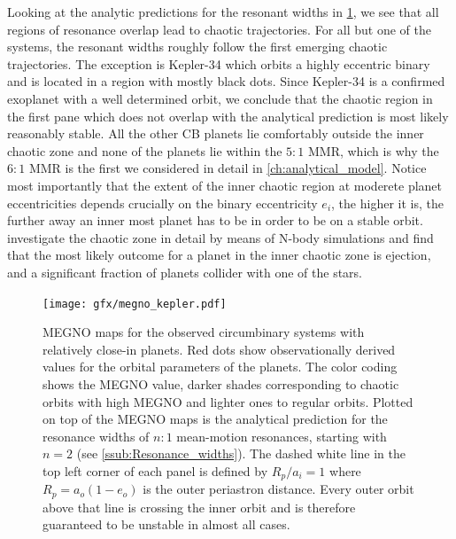\documentclass[ twoside,openright,titlepage,numbers=noenddot,headinclude,%
                footinclude=true,cleardoublepage=empty,abstractoff, %
                BCOR=5mm,paper=a4,fontsize=11pt,%
                american,%
                ]{scrreprt}
\begin{document}
Looking at the analytic predictions for the resonant widths in 
\cref{fig:megno_kepler}, we see that all regions of resonance overlap
lead to chaotic trajectories. For all but one of the systems, the 
resonant widths roughly follow the first emerging chaotic trajectories.
The exception is Kepler-34 which orbits a highly eccentric binary
and is located in a region with mostly black dots. Since Kepler-34 
is a confirmed exoplanet with a well determined orbit, we conclude 
that the chaotic region in the first pane which does not overlap with 
the analytical prediction is most likely reasonably stable. All the 
other CB planets lie comfortably outside the inner
chaotic zone and none of the planets lie within the $5:1$ MMR, which
is why the $6:1$ MMR is the first we considered in detail in 
\cref{ch:analytical_model}. Notice most importantly that
the extent of the inner chaotic region at moderete planet eccentricities
depends crucially on the binary eccentricity $e_i$, the higher it is, 
the further away an inner most planet has to be in order to be on a
stable orbit. \cite{Sutherland2015} investigate the chaotic zone
in detail by means of N-body simulations and find that the most likely
outcome for a planet in the inner chaotic zone is ejection, and a 
significant fraction of planets collider with one of the stars.
\begin{figure}[!t]
\centering
\texttt{[image: gfx/megno\_kepler.pdf]}
\caption{MEGNO maps for the observed circumbinary systems with relatively
    close-in planets. Red dots show observationally derived values for 
    the orbital parameters of the planets. The color coding shows the MEGNO 
    value, darker shades 
    corresponding to chaotic orbits with high MEGNO and lighter ones to 
    regular orbits. Plotted on top of the MEGNO maps is the analytical 
    prediction for the resonance widths of $n:1$ mean-motion resonances, 
    starting with $n=2$ (see \cref{ssub:Resonance_widths}). 
The dashed white line in
    the top left corner of each panel  is defined 
    by $R_p/a_i=1$ where $R_p=a_o(1-e_o)$
    is the outer periastron distance. Every outer orbit above that line
    is crossing the inner orbit and is therefore guaranteed to be 
    unstable in almost all cases.}
\label{fig:megno_kepler}
\end{figure}
\end{document}
